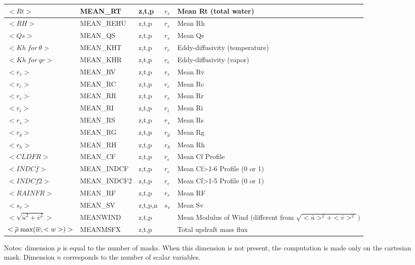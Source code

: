 \begin{longtable}[c]{|p{}|p{}|p{}|p{}|p{}|}
$<Rt>$              & MEAN\_RT     & z,t,p   & $r_v$ & Mean Rt (total water) \\\hline
$<RH>$              & MEAN\_REHU   & z,t,p   & $r_v$ & Mean Rh \\\hline
$<Qs>$              & MEAN\_QS     & z,t,p   & $r_v$ & Mean Qs \\\hline
$<Kh\ for\ \theta>$ & MEAN\_KHT    & z,t,p   & $r_c$ & Eddy-diffusivity (temperature) \\\hline
$<Kh\ for\ qr>$     & MEAN\_KHR    & z,t,p   & $r_c$ & Eddy-diffusivity (vapor) \\\hline
$<r_v>$             & MEAN\_RV     & z,t,p   & $r_v$ & Mean Rv \\\hline
$<r_c>$             & MEAN\_RC     & z,t,p   & $r_c$ & Mean Rc \\\hline
$<r_r>$             & MEAN\_RR     & z,t,p   & $r_r$ & Mean Rr \\\hline
$<r_i>$             & MEAN\_RI     & z,t,p   & $r_i$ & Mean Ri \\\hline
$<r_s>$             & MEAN\_RS     & z,t,p   & $r_s$ & Mean Rs \\\hline
$<r_g>$             & MEAN\_RG     & z,t,p   & $r_g$ & Mean Rg \\\hline
$<r_h>$             & MEAN\_RH     & z,t,p   & $r_h$ & Mean Rh \\\hline
$<CLDFR>$           & MEAN\_CF     & z,t,p   & $r_c$ & Mean Cf Profile \\\hline
$<INDCf>$           & MEAN\_INDCF  & z,t,p   & $r_c$ & Mean Cf>1-6 Profile (0 or 1) \\\hline
$<INDCf2>$          & MEAN\_INDCF2 & z,t,p   & $r_c$ & Mean Cf>1-5 Profile (0 or 1) \\\hline
$<RAINFR>$          & MEAN\_RF     & z,t,p   & $r_r$ & Mean RF \\\hline
$<s_v>$             & MEAN\_SV     & z,t,p,n & $s_v$ & Mean Sv \\\hline
$<\sqrt{\overline{u}^2+\overline{v}^2}>$ & MEANWIND & z,t,p &  & Mean Modulus of Wind (different from $\sqrt{<\overline{u}>^2+<\overline{v}>^2})$ \\
\hline
$<\overline{\rho} \;{\rm max}(\overline{w},<w>) >$  & MEANMSFX & z,t,p & & Total updraft mass flux \\\hline
\end{longtable}

Notes: dimension $p$ is equal to the number of masks. When this dimension is not present, the computation is made only on the cartesian mask. Dimension $n$ corresponds to the number of scalar variables.


